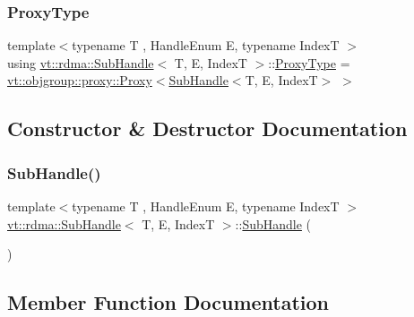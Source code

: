 \mbox{\label{structvt_1_1rdma_1_1_sub_handle_a758bee2e499658cfef92ace83eea6590}} 
\subsubsection{\texorpdfstring{Proxy\+Type}{ProxyType}}
{\footnotesize\ttfamily template$<$typename T , Handle\+Enum E, typename IndexT $>$ \\
using \hyperlink{structvt_1_1rdma_1_1_sub_handle}{vt\+::rdma\+::\+Sub\+Handle}$<$ T, E, IndexT $>$\+::\hyperlink{structvt_1_1rdma_1_1_sub_handle_a758bee2e499658cfef92ace83eea6590}{Proxy\+Type} =  \hyperlink{structvt_1_1objgroup_1_1proxy_1_1_proxy}{vt\+::objgroup\+::proxy\+::\+Proxy}$<$\hyperlink{structvt_1_1rdma_1_1_sub_handle}{Sub\+Handle}$<$T, E, IndexT$>$ $>$}



\subsection{Constructor \& Destructor Documentation}
\mbox{\label{structvt_1_1rdma_1_1_sub_handle_a451c1375245f317a93fef612e1954c96}} 
\subsubsection{\texorpdfstring{Sub\+Handle()}{SubHandle()}}
{\footnotesize\ttfamily template$<$typename T , Handle\+Enum E, typename IndexT $>$ \\
\hyperlink{structvt_1_1rdma_1_1_sub_handle}{vt\+::rdma\+::\+Sub\+Handle}$<$ T, E, IndexT $>$\+::\hyperlink{structvt_1_1rdma_1_1_sub_handle}{Sub\+Handle} (\begin{DoxyParamCaption}{ }\end{DoxyParamCaption})\hspace{0.3cm}{\ttfamily [default]}}



\subsection{Member Function Documentation}
\mbox{\label{structvt_1_1rdma_1_1_sub_handle_a9773a9d0641613d9ebe10c4a93befd4b}} 

